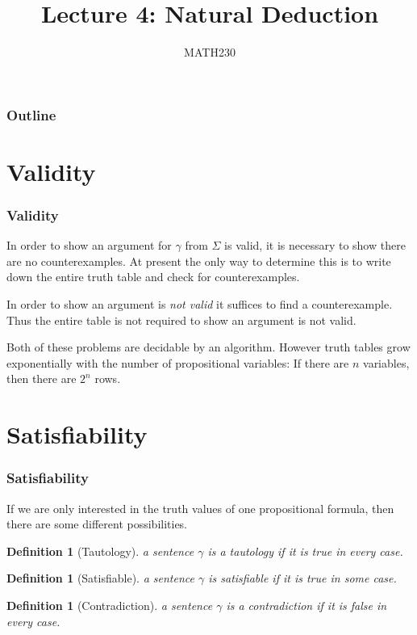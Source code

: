 \documentclass{beamer}
\title{Lecture 4: Natural Deduction}
\author{MATH230}
\institute{Te Kura P\=angarau $\vert$ School of Mathematics and Statistics \\ Te Whare W\=ananga o Waitaha $\vert$ University of Canterbury}
\date{}
\theoremstyle{indentDefn} \newtheorem{defn}[]{Definition}
\begin{document}
\begin{frame}

  \titlepage

\end{frame}

\begin{frame}
  \frametitle{Outline}

  \tableofcontents

\end{frame}

\section{Validity}

\begin{frame}
  \frametitle{Validity}

	In order to show an argument for $\gamma$ from $\Sigma$ is valid, it is necessary to show there are no counterexamples. At present the only way to determine this is to write down the entire truth table and check for counterexamples. 
	
	\vspace{1cm}
	
	In order to show an argument is \emph{not valid} it suffices to find a counterexample. Thus the entire table is not required to show an argument is not valid. 

	\vspace{1cm}
	
	Both of these problems are decidable by an algorithm. However truth tables grow exponentially with the number of propositional variables: If there are $n$ variables, then there are $2^{n}$ rows. 
\end{frame}


\section{Satisfiability}

\begin{frame}
	\frametitle{Satisfiability}
	
	If we are only interested in the truth values of one propositional formula, then there are some different possibilities.
	
	\begin{defn}[Tautology]
		a sentence $\gamma$ is a tautology if it is true in every case.
	\end{defn} 
	
	\begin{defn}[Satisfiable]
		a sentence $\gamma$ is satisfiable if it is true in some case.
	\end{defn} 
	
	\begin{defn}[Contradiction]
		a sentence $\gamma$ is a contradiction if it is false in every case.
	\end{defn} 

	
\end{frame}
\end{document}
